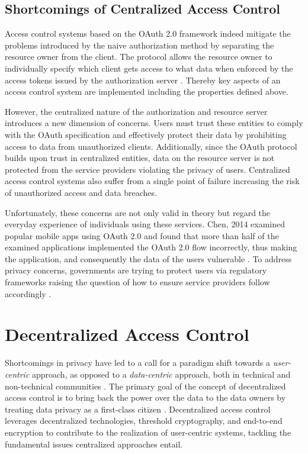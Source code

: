 \documentclass[conference]{IEEEtran}
\begin{document}
\subsection{Shortcomings of Centralized Access Control}
\label{sec:shortcomings}
Access control systems based on the OAuth 2.0 framework indeed mitigate the problems introduced by the naive authorization method by separating the resource owner from the client.
The protocol allows the resource owner to individually specify which client gets access to what data when enforced by the access tokens issued by the authorization server \cite{hardt_oauth_2012}.
Thereby key aspects of an access control system are implemented including the properties defined above.

However, the centralized nature of the authorization and resource server introduces a new dimension of concerns.
Users must trust these entities to comply with the OAuth specification and effectively protect their data by prohibiting access to data from unauthorized clients.
Additionally, since the OAuth protocol builds upon trust in centralized entities, data on the resource server is not protected from the service providers violating the privacy of users.
Centralized access control systems also suffer from a single point of failure increasing the risk of unauthorized access and data breaches.

Unfortunately, these concerns are not only valid in theory but regard the everyday experience of individuals using these services.
Chen, 2014 examined popular mobile apps using OAuth 2.0 and found that more than half of the examined applications implemented the OAuth 2.0 flow incorrectly, thus making the application, and consequently the data of the users vulnerable \cite{chen_oauth_2014}.
To address privacy concerns, governments are trying to protect users via regulatory frameworks raising the question of how to ensure service providers follow accordingly \cite{noauthor_general_nodate}.

\section{Decentralized Access Control}
\label{sec:decentralized_access_control}
Shortcomings in privacy have led to a call for a paradigm shift towards a \textit{user-centric} approach, as opposed to a \textit{data-centric} approach, both in technical and non-technical communities \cite{ernstberger_sok_2023, shafagh_droplet_2020}.
The primary goal of the concept of decentralized access control is to bring back the power over the data to the data owners by treating data privacy as a first-class citizen \cite{ernstberger_sok_2023}.
Decentralized access control leverages decentralized technologies, threshold cryptography, and end-to-end encryption to contribute to the realization of user-centric systems, tackling the fundamental issues centralized approaches entail.
\end{document}

